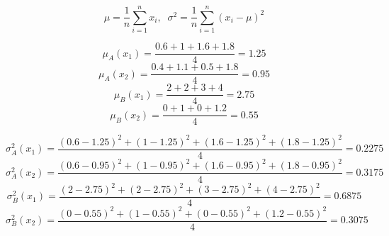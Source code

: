 \documentclass{article}
\begin{document}
\[
\mu = \frac{1}{n}\sum_{i = 1}^n x_i, \;\;\sigma^2 = \frac{1}{n}\sum_{i = 1}^n (x_i - \mu)^2
\]

\[
\mu_A(x_1) = \frac{0.6+1+1.6+1.8}{4} = 1.25
\]
\[
\mu_A(x_2) = \frac{0.4+1.1+0.5+1.8}{4} = 0.95
\]
\[
\mu_B(x_1) = \frac{2+2+3+4}{4} = 2.75
\]
\[
\mu_B(x_2) = \frac{0+1+0+1.2}{4} = 0.55
\]

\[
\sigma^2_A(x_1) = \frac{(0.6-1.25)^2 + (1 - 1.25)^2 + (1.6 - 1.25)^2 + (1.8 - 1.25)^2}{4} = 0.2275
\]
\[
\sigma^2_A(x_2) = \frac{(0.6-0.95)^2 + (1 - 0.95)^2 + (1.6 - 0.95)^2 + (1.8 - 0.95)^2}{4} = 0.3175
\]
\[
\sigma^2_B(x_1) = \frac{(2 - 2.75)^2 + (2 - 2.75)^2 + (3 - 2.75)^2 + (4 - 2.75)^2}{4} = 0.6875
\]
\[
\sigma^2_B(x_2) = \frac{(0 - 0.55)^2 + (1 - 0.55)^2 + (0 - 0.55)^2 + (1.2 - 0.55)^2}{4} = 0.3075
\]














\newpage
\end{document}
